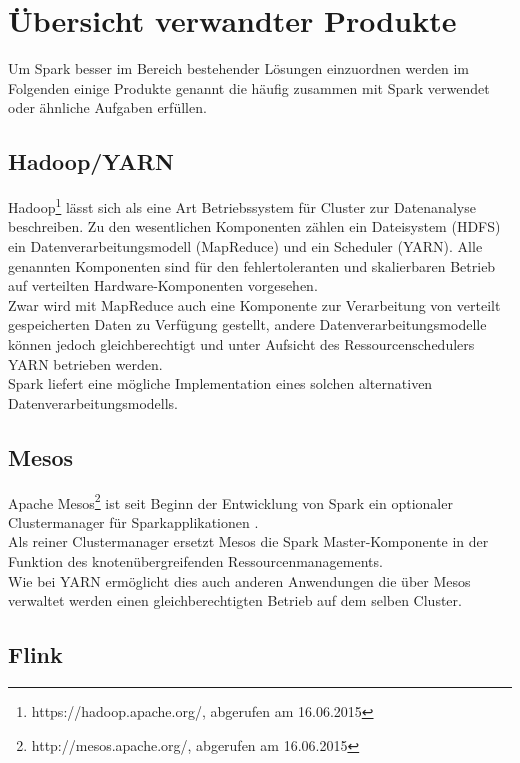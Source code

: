 \section{Übersicht verwandter Produkte}
Um Spark besser im Bereich bestehender Lösungen einzuordnen werden im Folgenden einige Produkte genannt die häufig zusammen mit Spark verwendet oder ähnliche Aufgaben erfüllen.

\subsection{Hadoop/YARN}

Hadoop\footnote{https://hadoop.apache.org/, abgerufen am 16.06.2015} lässt sich als eine Art Betriebssystem für Cluster zur Datenanalyse beschreiben. Zu den wesentlichen Komponenten zählen ein Dateisystem (HDFS) ein Datenverarbeitungsmodell (MapReduce) und ein Scheduler (YARN).
Alle genannten Komponenten sind für den fehlertoleranten und skalierbaren Betrieb auf verteilten Hardware-Komponenten vorgesehen.\\

Zwar wird mit MapReduce auch eine Komponente zur Verarbeitung von verteilt gespeicherten Daten zu Verfügung gestellt, andere Datenverarbeitungsmodelle können jedoch gleichberechtigt und unter Aufsicht des Ressourcenschedulers YARN betrieben werden.\\

Spark liefert eine mögliche Implementation eines solchen alternativen Datenverarbeitungsmodells.

\subsection{Mesos}

Apache Mesos\footnote{http://mesos.apache.org/, abgerufen am 16.06.2015} ist seit Beginn der Entwicklung von Spark ein optionaler Clustermanager für Sparkapplikationen \cite{Mat12}.\\

Als reiner Clustermanager ersetzt Mesos die Spark Master-Komponente in der Funktion des knotenübergreifenden Ressourcenmanagements.\\

Wie bei YARN ermöglicht dies auch anderen Anwendungen die über Mesos verwaltet werden einen gleichberechtigten Betrieb auf dem selben Cluster.\\

\subsection{Flink}

